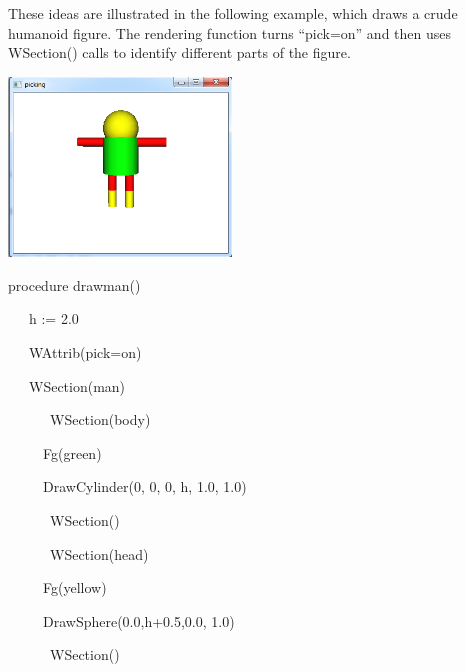 \documentclass[letterpaper]{article}
\begin{document}
{\bigskip

{
These ideas are illustrated in the following example, which draws a crude humanoid figure. The rendering function turns
\textsf{{}``pick=on''} and then uses \textsf{WSection()} calls to identify different parts of the figure.}



\begin{center}
\includegraphics[width=2.3402in,height=1.8799in]{utr9/utr9-img034.png}
\end{center}

\bigskip


\bigskip

{\sffamily
procedure drawman()}

{\sffamily
\ \ \ h := 2.0}

{\sffamily
\ \ \ WAttrib({\textquotedbl}pick=on{\textquotedbl})}

{\sffamily
\ \ \ WSection({\textquotedbl}man{\textquotedbl})}

{\sffamily
\ \ \ \ \ \ WSection({\textquotedbl}body{\textquotedbl})}

{\sffamily
\ \ \ \ \  Fg({\textquotedbl}green{\textquotedbl})}

{\sffamily
\ \ \ \ \  DrawCylinder(0, 0, 0, h, 1.0, 1.0)}

{\sffamily
\ \ \ \ \ \ WSection()}

{\sffamily
\ \ \ \ \ \ WSection({\textquotedbl}head{\textquotedbl})}

{\sffamily
\ \ \ \ \  Fg({\textquotedbl}yellow{\textquotedbl})}

{\sffamily
\ \ \ \ \  DrawSphere(0.0,h+0.5,0.0, 1.0)}

{\sffamily
\ \ \ \ \ \ WSection()}

}
\end{document}
